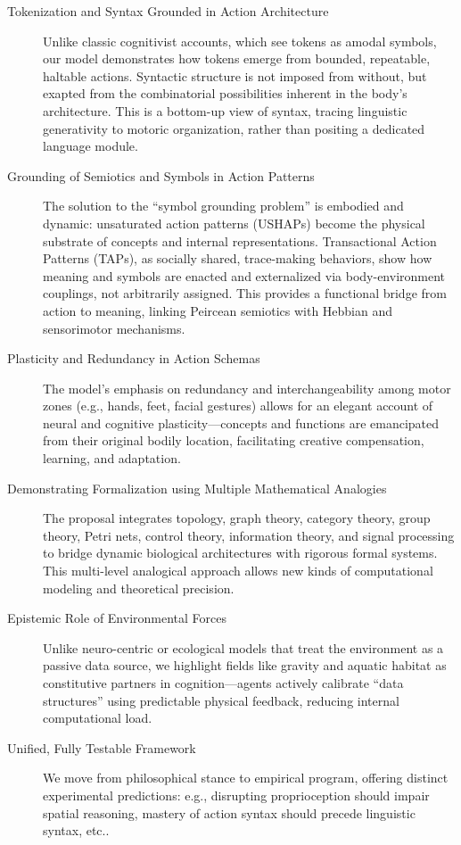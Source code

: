 \begin{description}
    \item[Tokenization and Syntax Grounded in Action Architecture]
    Unlike classic cognitivist accounts, which see tokens as amodal symbols, our model demonstrates how tokens emerge from bounded, repeatable, haltable actions. Syntactic structure is not imposed from without, but exapted from the combinatorial possibilities inherent in the body's architecture. This is a bottom-up view of syntax, tracing linguistic generativity to motoric organization, rather than positing a dedicated language module.
    \item[Grounding of Semiotics and Symbols in Action Patterns]
    The solution to the “symbol grounding problem” is embodied and dynamic: unsaturated action patterns (USHAPs) become the physical substrate of concepts and internal representations. Transactional Action Patterns (TAPs), as socially shared, trace-making behaviors, show how meaning and symbols are enacted and externalized via body-environment couplings, not arbitrarily assigned. This provides a functional bridge from action to meaning, linking Peircean semiotics with Hebbian and sensorimotor mechanisms.

    \item[Plasticity and Redundancy in Action Schemas]
    The model’s emphasis on redundancy and interchangeability among motor zones (e.g., hands, feet, facial gestures) allows for an elegant account of neural and cognitive plasticity—concepts and functions are emancipated from their original bodily location, facilitating creative compensation, learning, and adaptation.

    \item[Demonstrating Formalization using Multiple Mathematical Analogies] 
    The proposal integrates topology, graph theory, category theory, group theory, Petri nets, control theory, information theory, and signal processing to bridge dynamic biological architectures with rigorous formal systems. This multi-level analogical approach allows new kinds of computational modeling and theoretical precision.

    \item[Epistemic Role of Environmental Forces]
    Unlike neuro-centric or ecological models that treat the environment as a passive data source, we highlight fields like gravity and aquatic habitat as constitutive partners in cognition—agents actively calibrate “data structures” using predictable physical feedback, reducing internal computational load.

    \item[Unified, Fully Testable Framework]
    We move from philosophical stance to empirical program, offering distinct experimental predictions: e.g., disrupting proprioception should impair spatial reasoning, mastery of action syntax should precede linguistic syntax, etc..


\end{description}
